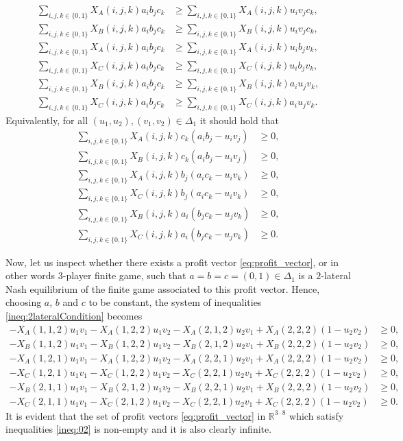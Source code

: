 \documentclass[a4paper,11pt,reqno,english]{amsart}
\theoremstyle{plain}
\theoremstyle{definition}
\begin{document}
\begin{align*}
	\sum_{i,j,k\in \{0,1\}} X_A(i,j,k) a_ib_jc_k & \geq \sum_{i,j,k\in \{0,1\}} X_A(i,j,k) u_iv_jc_k, \\
	\sum_{i,j,k\in \{0,1\}} X_B(i,j,k) a_ib_jc_k & \geq \sum_{i,j,k\in \{0,1\}} X_B(i,j,k) u_iv_jc_k, \\
	\sum_{i,j,k\in \{0,1\}} X_A(i,j,k) a_ib_jc_k & \geq \sum_{i,j,k\in \{0,1\}} X_A(i,j,k) u_ib_jv_k, \\
	\sum_{i,j,k\in \{0,1\}} X_C(i,j,k) a_ib_jc_k & \geq \sum_{i,j,k\in \{0,1\}} X_C(i,j,k) u_ib_jv_k, \\
	\sum_{i,j,k\in \{0,1\}} X_B(i,j,k) a_ib_jc_k & \geq \sum_{i,j,k\in \{0,1\}} X_B(i,j,k) a_iu_jv_k, \\
	\sum_{i,j,k\in \{0,1\}} X_C(i,j,k) a_ib_jc_k & \geq \sum_{i,j,k\in \{0,1\}} X_C(i,j,k) a_iu_jv_k.
\end{align*}
Equivalently, for all $(u_1,u_2),(v_1,v_2)\in \Delta_1$ it should hold that
\begin{align}\label{ineq:2lateralCondition}
	\sum_{i,j,k\in \{0,1\}} X_A(i,j,k) c_k(a_ib_j - u_iv_j)  & \geq 0, \nonumber \\
	\sum_{i,j,k\in \{0,1\}} X_B(i,j,k) c_k(a_ib_j - u_iv_j)  & \geq 0, \nonumber \\
	\sum_{i,j,k\in \{0,1\}} X_A(i,j,k) b_j(a_ic_k - u_iv_k)  & \geq 0, \nonumber \\
	\sum_{i,j,k\in \{0,1\}} X_C(i,j,k) b_j(a_ic_k - u_iv_k) & \geq 0, \nonumber \\
	\sum_{i,j,k\in \{0,1\}} X_B(i,j,k) a_i(b_jc_k - u_jv_k) & \geq 0, \nonumber \\
	\sum_{i,j,k\in \{0,1\}} X_C(i,j,k) a_i(b_jc_k - u_jv_k) & \geq 0.
\end{align}

\medbreak
Now, let us inspect whether there exists a profit vector \eqref{eq:profit_vector}, or in other words $3$-player finite game, such that $a=b=c=(0,1)\in\Delta_1$ is a $2$-lateral Nash equilibrium of the finite game associated to this profit vector.
Hence, choosing $a$, $b$ and $c$ to be constant, the system of inequalities \eqref{ineq:2lateralCondition} becomes
\begin{align}\label{ineq:02}
	-X_A(1,1,2)u_1v_1  -X_A(1,2,2)u_1v_2 -X_A(2,1,2)u_2v_1+X_A(2,2,2)(1-u_2v_2) & \geq 0,\nonumber \\
	-X_B(1,1,2)u_1v_1  -X_B(1,2,2)u_1v_2 -X_B(2,1,2)u_2v_1+X_B(2,2,2)(1-u_2v_2) & \geq 0,\nonumber \\
	-X_A(1,2,1)u_1v_1  -X_A(1,2,2)u_1v_2 -X_A(2,2,1)u_2v_1+X_A(2,2,2)(1-u_2v_2) & \geq 0,\nonumber \\
	-X_C(1,2,1)u_1v_1  -X_C(1,2,2)u_1v_2 -X_C(2,2,1)u_2v_1+X_C(2,2,2)(1-u_2v_2) & \geq 0,\nonumber \\
	-X_B(2,1,1)u_1v_1  -X_B(2,1,2)u_1v_2 -X_B(2,2,1)u_2v_1+X_B(2,2,2)(1-u_2v_2) & \geq 0,\nonumber \\
	-X_C(2,1,1)u_1v_1  -X_C(2,1,2)u_1v_2 -X_C(2,2,1)u_2v_1+X_C(2,2,2)(1-u_2v_2) & \geq 0.
\end{align}
It is evident that the set of profit vectors \eqref{eq:profit_vector} in $\mathbb{R}^{3\cdot 8}$ which satisfy inequalities \eqref{ineq:02} is non-empty and it is also clearly infinite.
\end{document}
